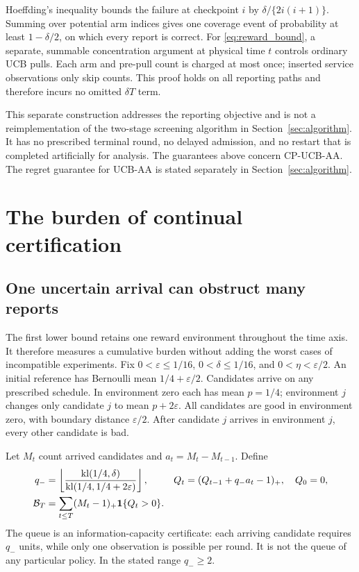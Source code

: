\documentclass[11pt]{article}
\begin{document}
Hoeffding's inequality bounds the failure at checkpoint $i$ by
$\delta/\{2i(i+1)\}$. Summing over potential arm indices gives one coverage
event of probability at least $1-\delta/2$, on which every report is correct.
For \eqref{eq:reward_bound}, a separate, summable concentration argument at
physical time $t$ controls ordinary UCB pulls. Each arm and pre-pull count
is charged at most once; inserted service observations only skip counts.
This proof holds on all reporting paths and therefore incurs no omitted
$\delta T$ term. \suppproof

This separate construction addresses the reporting objective and is not a
reimplementation of the two-stage screening algorithm in Section~\ref{sec:algorithm}. It has no prescribed terminal round,
no delayed admission, and no restart that is completed artificially for analysis.
The guarantees above concern CP-UCB-AA. The regret guarantee for UCB-AA is
stated separately in Section~\ref{sec:algorithm}.
\section{The burden of continual certification}
\label{sec:maintenance}

\subsection{One uncertain arrival can obstruct many reports}

The first lower bound retains one reward environment throughout the time axis.
It therefore measures a cumulative burden without adding the worst cases of
incompatible experiments. Fix
$0<\varepsilon\le1/16$, $0<\delta\le1/16$, and $0<\eta<\varepsilon/2$.
An initial reference has Bernoulli mean $1/4+\varepsilon/2$. Candidates arrive
on any prescribed schedule. In environment zero each has mean $p=1/4$;
environment $j$ changes only candidate $j$ to mean $p+2\varepsilon$.
All candidates are good in environment zero, with boundary distance
$\varepsilon/2$. After candidate $j$ arrives in environment $j$, every other
candidate is bad.

Let $M_t$ count arrived candidates and $a_t=M_t-M_{t-1}$. Define
\begin{align}
 q_-&=\left\lfloor\frac{\operatorname{kl}(1/4,\delta)}
                              {\operatorname{kl}(1/4,1/4+2\varepsilon)}\right\rfloor,
 &Q_t&=(Q_{t-1}+q_-a_t-1)_+,\quad Q_0=0,\notag\\
 \mathcal B_T&=\sum_{t\le T}(M_t-1)_+\mathbf 1\{Q_t>0\}.
 \label{eq:broadcast_queue}
\end{align}
The queue is an information-capacity certificate: each arriving candidate
requires $q_-$ units, while only one observation is possible per round. It is
not the queue of any particular policy. In the stated range $q_-\ge2$.
\end{document}
